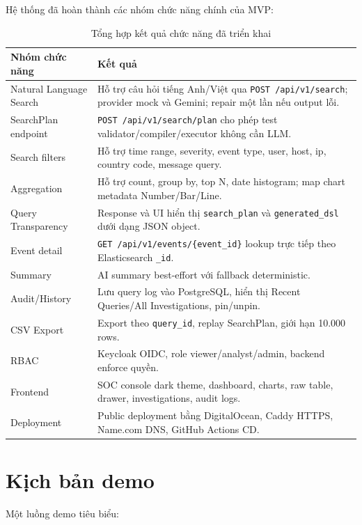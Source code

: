 \documentclass[12pt,a4paper]{report}
\begin{document}
Hệ thống đã hoàn thành các nhóm chức năng chính của MVP:

\begin{table}[H]
\centering
\caption{Tổng hợp kết quả chức năng đã triển khai}
\begin{tabularx}{\textwidth}{p{3.6cm}Y}
\toprule
\textbf{Nhóm chức năng} & \textbf{Kết quả} \\
\midrule
Natural Language Search & Hỗ trợ câu hỏi tiếng Anh/Việt qua \texttt{POST /api/v1/search}; provider mock và Gemini; repair một lần nếu output lỗi. \\
SearchPlan endpoint & \texttt{POST /api/v1/search/plan} cho phép test validator/compiler/executor không cần LLM. \\
Search filters & Hỗ trợ time range, severity, event type, user, host, ip, country code, message query. \\
Aggregation & Hỗ trợ count, group by, top N, date histogram; map chart metadata Number/Bar/Line. \\
Query Transparency & Response và UI hiển thị \texttt{search\_plan} và \texttt{generated\_dsl} dưới dạng JSON object. \\
Event detail & \texttt{GET /api/v1/events/\{event\_id\}} lookup trực tiếp theo Elasticsearch \texttt{\_id}. \\
Summary & AI summary best-effort với fallback deterministic. \\
Audit/History & Lưu query log vào PostgreSQL, hiển thị Recent Queries/All Investigations, pin/unpin. \\
CSV Export & Export theo \texttt{query\_id}, replay SearchPlan, giới hạn 10.000 rows. \\
RBAC & Keycloak OIDC, role viewer/analyst/admin, backend enforce quyền. \\
Frontend & SOC console dark theme, dashboard, charts, raw table, drawer, investigations, audit logs. \\
Deployment & Public deployment bằng DigitalOcean, Caddy HTTPS, Name.com DNS, GitHub Actions CD. \\
\bottomrule
\end{tabularx}
\end{table}

\section{Kịch bản demo}

Một luồng demo tiêu biểu:
\end{document}
